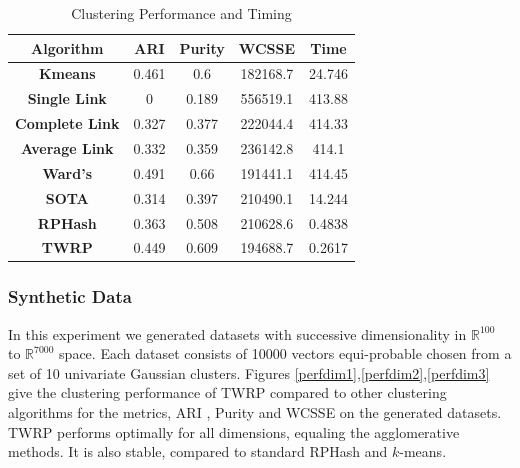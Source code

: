 \begin{center}
 \begin{table}
  \centering
\begin{tabular}{|c|c|c|c|c|}\hline
\cellcolor[gray]{0.9}\textbf{Algorithm}	&\cellcolor[gray]{0.9}\textbf{ARI}	&\cellcolor[gray]{0.9}\textbf{Purity} &\cellcolor[gray]{0.9}\textbf{WCSSE} &\cellcolor[gray]{0.9}\textbf{Time} \\ \hline
\cellcolor[gray]{0.9}\textbf{Kmeans}		&0.461  &0.6   &182168.7&24.746\\\hline
\cellcolor[gray]{0.9}\textbf{Single Link}  		&0      &0.189 &556519.1&413.88\\\hline
\cellcolor[gray]{0.9}\textbf{Complete Link}  		&0.327  &0.377 &222044.4&414.33\\\hline
\cellcolor[gray]{0.9}\textbf{Average Link}  		&0.332  &0.359 &236142.8&414.1\\\hline
\cellcolor[gray]{0.9}\textbf{Ward's}		&0.491  &0.66  &191441.1&414.45\\\hline
\cellcolor[gray]{0.9}\textbf{SOTA}  		&0.314  &0.397 &210490.1&14.244\\\hline
\cellcolor[gray]{0.9}\textbf{RPHash}		&0.363  &0.508 &210628.6&0.4838\\\hline
\cellcolor[gray]{0.9}\textbf{TWRP}	&0.449	&0.609 &194688.7&0.2617\\\hline
\end{tabular}
\caption{Clustering Performance and Timing}\label{perftimetable}
\end{table}
\end{center} 

\subsubsection{Synthetic Data}

In this experiment we generated datasets with successive dimensionality in $\mathbb{R}^{100}$ to
$\mathbb{R}^{7000}$ space.  Each dataset consists of 10000 vectors equi-probable chosen from a set of
10 univariate Gaussian clusters.  Figures \ref{perfdim1},\ref{perfdim2},\ref{perfdim3} give the
clustering performance of \textsf{TWRP} compared to other clustering algorithms for the metrics, ARI , Purity
and WCSSE on the generated datasets.  \textsf{TWRP} performs optimally for all dimensions, equaling the agglomerative
methods.  It is also stable, compared to standard \textsf{RPHash} and $k$-means.


